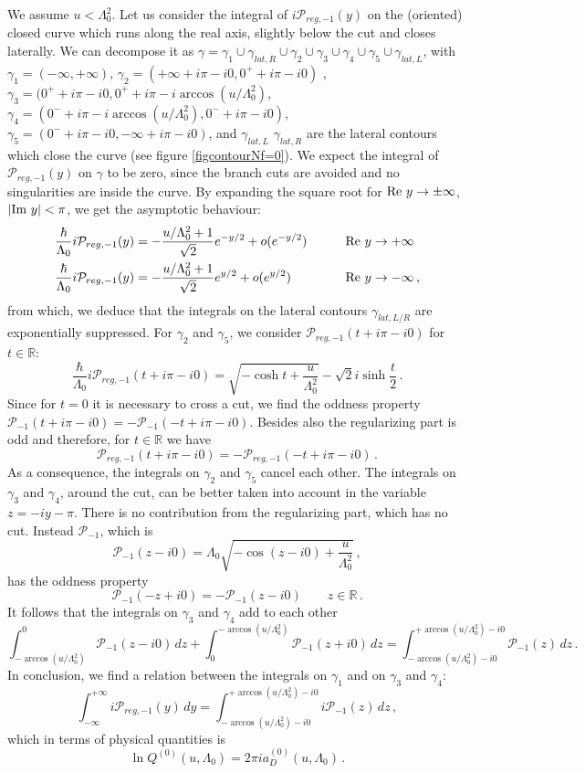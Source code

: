 \documentclass[11pt,a4paper]{elsarticle}
\def \g {\gamma}
\def \CP {\mathcal{P}}
\newcommand{\be}{\begin{equation}}
\newcommand{\ee}{\end{equation}}
\def\Re{{\rm Re ~}}
\def\Im{{\rm Im ~}}
\numberwithin{figure}{section}
\numberwithin{table}{section}
\begin{document}
We assume $u < \Lambda_0^2$. Let us consider the integral of $i \CP_{reg,-1}(y)$ on the (oriented) closed curve which runs along the real axis, slightly below the cut and closes laterally. We can decompose it as $\gamma = \gamma_1 \cup \gamma_{lat,R} \cup \gamma_2 \cup  \gamma_3 \cup \gamma_4 \cup \gamma_5 \cup \gamma_{lat,L}$, with $\gamma_1 =(-\infty , +\infty)$, $\gamma_2 = (+\infty + i \pi - i 0  , 0^+ + i \pi - i 0)$ , $\gamma_3 = (0^+ +  i \pi  - i 0, 0^+ +i \pi - i\arccos (u/\Lambda_0^2)$, $\gamma_4 = (0^- + i \pi - i \arccos (u/\Lambda_0^2), 0^- + i \pi - i 0 )$, $\gamma_5 = (0^- + i \pi - i 0  , -\infty + i \pi -i 0 )$, and $\gamma_{lat,L}$ $\gamma_{lat,R}$ are the lateral contours which close the curve (see figure \ref{figcontourNf=0}). 
We expect the integral of $ \mathcal{P}_{reg,-1}(y)$ on $\gamma$ to be zero, since the branch cuts are avoided and no singularities are inside the curve.
By expanding the square root for $\Re{y} \to \pm \infty$, $| \Im y | < \pi$, we get the asymptotic behaviour:
\begin{align}
  \frac{\hbar }{\Lambda_0}i\mathcal{P}_{reg,-1}(y) &= - \frac{u/\Lambda_0^2+1}{\sqrt{2}}e^{-y/2} +o(e^{-y/2} ) \qquad &\Re{y} &\to  + \infty \label{exp+} \\
   \frac{\hbar}{\Lambda_0}i \mathcal{P}_{reg,-1}(y) &= -\frac{u/\Lambda_0^2+1}{\sqrt{2}}e^{y/2} +o(e^{y/2} ) \qquad &\Re{y} &\to  -\infty \label{exp-}\,,
\end{align} 
from which, we deduce that the integrals on the lateral contours $\gamma_{lat,L/R}$ are exponentially suppressed.
For $\g_2$ and $\g_5$, we consider $\CP_{reg,-1}(t + i \pi - i 0)$ for $t \in \mathbb{R}$: 
\be
  \frac{\hbar }{\Lambda_0}i \CP_{reg,-1}(t + i \pi - i 0) =\sqrt{- \cosh{t}+\frac{u}{\Lambda_0^2}}-\sqrt{2} i \sinh \frac{t}{2}\,.
\ee
 Since for $t=0$ it is necessary to cross a cut, we find the oddness property $\CP_{-1}(t + i \pi - i 0) = -\CP_{-1}(-t + i \pi - i 0)  $. Besides also the regularizing part is odd and therefore, for $t \in \mathbb{R}$ we have
\be
\CP_{reg,-1}(t + i \pi - i 0) = -\CP_{reg,-1}(-t + i \pi - i 0) \,.
\ee 
As a consequence, the integrals on $\g_2$ and $\g_5$ cancel each other.
The integrals on $\g_3$ and $\g_4$, around the cut, can be better taken into account in the variable $z=-i y - \pi$. There is no contribution from the regularizing part, which has no cut. Instead $\CP_{-1}$, which is
\be
\CP_{-1}(z - i 0)=\Lambda_0\sqrt{- \cos{(z-i0)}+\frac{u}{\Lambda_0^2}}\,,
\ee
has the oddness property 
\be
\CP_{-1}(-z + i 0)= - \CP_{-1}(z - i 0) \qquad z \in \mathbb{R}\,.
\ee 
It follows that the integrals on $\g_3$ and $\g_4$ add to each other
\be
\int_{-\arccos (u /\Lambda_0^2)} ^{0}  \CP_{-1}(z-i0) \, dz +  \int_{0}^{-\arccos (u /\Lambda_0^2)}  \CP_{-1}(z+i0) \, dz  =\int_{-\arccos (u /\Lambda_0^2) -i0}^{ +\arccos (u /\Lambda_0^2) -i0}  \CP_{-1}(z ) \, dz \,.  
\ee
In conclusion, we find a relation between the integrals on $\g_1 $ and on $\g_3$ and $\g_4$:
\be
 \int_{-\infty }^{+\infty }i \mathcal{P}_{reg,-1}(y) \, dy =\int_{-\arccos (u /\Lambda_0^2) -i0}^{ +\arccos (u /\Lambda_0^2) -i0} i \CP_{-1}(z ) \, dz \,,
\ee
which in terms of physical quantities is
\be
\ln Q^{(0)}(u,\Lambda_0) = 2\pi i a_D^{(0)}(u,\Lambda_0)  \, .
\ee
\end{document}
